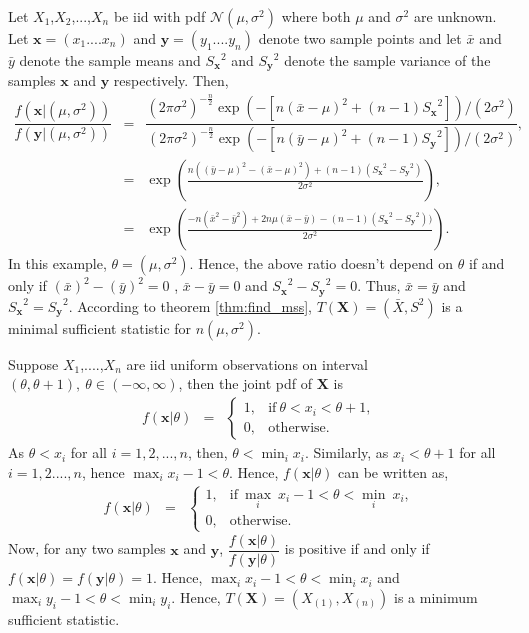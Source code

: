 \documentclass[a4paper,english,12pt]{article}
\newcommand{\bx}{\mathbf{x}}
\newcommand{\by}{\mathbf{y}}
\newcommand{\bX}{\mathbf{X}}
\begin{document}
\begin{exmp}
Let $X_1$,$X_2$,...,$X_n$ be iid with pdf $\mathcal{N}(\mu,\sigma^2)$ where both $\mu$ and $\sigma^2$ are unknown. Let $\bx=(x_1....x_n)$ and $\by=(y_1....y_n)$ denote two sample points and let $\bar{x}$ and $\bar{y}$ denote the sample means and ${S_\bx}^2$ and ${S_\by}^2$ denote the sample variance of the samples $\bx$ and $\by$ respectively. Then,
\begin{eqnarray}
\dfrac{f(\bx|(\mu,\sigma^2))}{f(\by|(\mu,\sigma^2))} &=& \dfrac{(2\pi\sigma^2)^{-\tfrac{n}{2}}\exp(-[n(\bar{x}-\mu)^2 + (n-1){S_{\bx}}^2])/(2\sigma^2)}{(2\pi\sigma^2)^{-\tfrac{n}{2}}\exp(-[n(\bar{y}-\mu)^2 + (n-1){S_{\by}}^2])/(2\sigma^2)},\\
&=&\exp\left(\frac{n((\bar{y}-\mu)^2-(\bar{x}-\mu)^2)+(n-1)({S_{\bx}}^2-{S_{\by}}^2)}{2\sigma^2}\right),\\
&=&\exp\left(\frac{-n(\bar{x}^2-\bar{y}^2)+2n\mu(\bar{x}-\bar{y})-(n-1)({S_{\bx}}^2-{S_{\by}}^2))}{2\sigma^2}\right).
\end{eqnarray}
In this example, $\theta = (\mu,\sigma^2)$. Hence, the above ratio doesn't depend on $\theta$ if and only if $(\bar{x})^2 - (\bar{y})^2 = 0$ , $\bar{x} - \bar{y} = 0$ and ${S_{\bx}}^2-{S_{\by}}^2 = 0$. Thus, $\bar{x} = \bar{y}$ and ${S_{\bx}}^2 = {S_{\by}}^2$. According to theorem \ref{thm:find_mss}, $T(\bX) = (\bar{X},S^2)$ is a minimal sufficient statistic for $n(\mu,\sigma^2)$.
\end{exmp}
\begin{exmp}
Suppose $X_1$,....,$X_n$ are iid uniform observations on interval $(\theta,\theta+1), ~\theta\in(-\infty,\infty)$, then the joint pdf of $\bX$ is
\begin{eqnarray}
f(\bx|\theta) &=&
\begin{cases}
1, &\mbox{if}~ \theta<x_i<\theta+1,\\
0, &\mbox{otherwise}.
\end{cases}
\end{eqnarray}
As $\theta<x_i$ for all $i=1,2,...,n$, then, $\theta<\displaystyle\min_i x_i$. Similarly, as $x_i<\theta+1$ for all $i=1,2....,n$, hence $\displaystyle\max_i x_i - 1 < \theta$. Hence, $f(\bx|\theta)$ can be written as,
\begin{eqnarray}
f(\bx|\theta) &=&
\begin{cases}
1, &\mbox{if}~\displaystyle\max_i~ x_i - 1 < \theta < \displaystyle\min_i~x_i,\\
0, &\mbox{otherwise}.
\end{cases}
\end{eqnarray}
Now, for any two samples $\bx$ and $\by$, $\dfrac{f(\bx|\theta)}{f(\by|\theta)}$ is positive if and only if $f(\bx|\theta) = f(\by|\theta) = 1 $. Hence, $\displaystyle\max_i x_i - 1 < \theta < \displaystyle\min_i x_i$ and $\displaystyle\max_i y_i - 1 < \theta < \displaystyle\min_i y_i$.
Hence, $T(\bX)=(X_{(1)},X_{(n)})$ is a minimum sufficient statistic.
\end{exmp}
\end{document}
